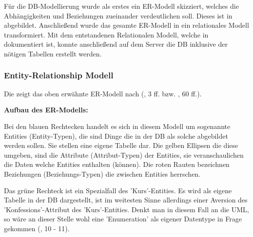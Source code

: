 Für die \ac{DB}-Modellierung wurde als erstes ein \ac{ER-Modell} skizziert, welches die Abhängigkeiten und Beziehungen zueinander verdeutlichen soll. Dieses ist in  abgebildet. Anschließend wurde das gesamte \ac{ER-Modell} in ein relationales Modell transformiert.
Mit dem entstandenen Relationalen Modell, welche in  dokumentiert ist, konnte anschließend auf dem Server die \ac{DB} inklusive der nötigen Tabellen erstellt werden.

\subsubsection{Entity-Relationship Modell}\label{subsec:ERModell}

Die  zeigt das oben erwähnte \ac{ER-Modell} nach  (\cite{ChenPe}, 3 ff. bzw. \cite{VossenG-DDD}, 60 ff.).

\textbf{Aufbau des \ac{ER-Modell}s:}

Bei den blauen Rechtecken handelt es sich in diesem Modell um sogenannte Entities (Entity-Typen), die sind Dinge die in der \ac{DB} als solche abgebildet werden sollen. Sie stellen eine eigene Tabelle dar. Die gelben Ellipsen die diese umgeben, sind die Attribute (Attribut-Typen) der Entities, sie veranschaulichen die Daten welche Entities enthalten (können).
Die roten Rauten bezeichnen Beziehungen (Beziehungs-Typen) die zwischen Entities herrschen.

Das grüne Rechteck ist ein Spezialfall des 'Kurs'-Entities. Es wird als eigene Tabelle in der \ac{DB} dargestellt, ist im weitesten Sinne allerdings einer Aversion des 'Konfessions'-Attribut des 'Kurs'-Entities. Denkt man in diesem Fall an die \ac{UML}, so wäre an dieser Stelle wohl eine 'Enumeration' als eigener Datentype in Frage gekommen (\cite{BalzertH_UML2}, 10 - 11).

